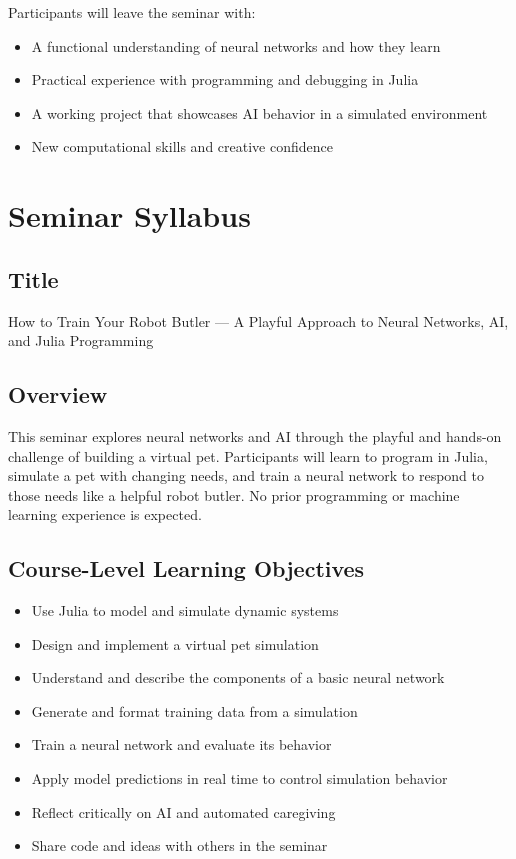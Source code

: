 \documentclass[10pt]{book}
\begin{document}
Participants will leave the seminar with:
\begin{itemize}[itemsep=1ex]
    \item A functional understanding of neural networks and how they learn
    \item Practical experience with programming and debugging in Julia
    \item A working project that showcases AI behavior in a simulated environment
    \item New computational skills and creative confidence
\end{itemize}



\section*{Seminar Syllabus}

\subsection*{Title}
How to Train Your Robot Butler — A Playful Approach to Neural Networks, AI, and Julia Programming

\subsection*{Overview}
This seminar explores neural networks and AI through the playful and hands-on challenge of building a virtual pet. Participants will learn to program in Julia, simulate a pet with changing needs, and train a neural network to respond to those needs like a helpful robot butler. No prior programming or machine learning experience is expected.


\subsection*{Course-Level Learning Objectives}
\begin{itemize}
  \item Use Julia to model and simulate dynamic systems
  \item Design and implement a virtual pet simulation
  \item Understand and describe the components of a basic neural network
  \item Generate and format training data from a simulation
  \item Train a neural network and evaluate its behavior
  \item Apply model predictions in real time to control simulation behavior
  \item Reflect critically on AI and automated caregiving
  \item Share code and ideas with others in the seminar
\end{itemize}
\end{document}
